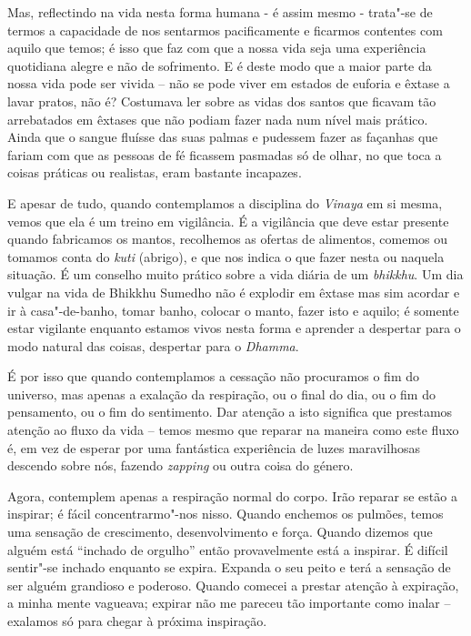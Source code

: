 Mas, reflectindo na vida nesta forma humana - é assim mesmo - trata"-se
de termos a capacidade de nos sentarmos pacificamente e ficarmos
contentes com aquilo que temos; é isso que faz com que a nossa vida seja
uma experiência quotidiana alegre e não de sofrimento. E é deste modo
que a maior parte da nossa vida pode ser vivida -- não se pode viver em
estados de euforia e êxtase a lavar pratos, não é? Costumava ler sobre
as vidas dos santos que ficavam tão arrebatados em êxtases que não
podiam fazer nada num nível mais prático. Ainda que o sangue fluísse das
suas palmas e pudessem fazer as façanhas que fariam com que as pessoas
de fé ficassem pasmadas só de olhar, no que toca a coisas práticas ou
realistas, eram bastante incapazes.

E apesar de tudo, quando contemplamos a disciplina do \emph{Vinaya} em
si mesma, vemos que ela é um treino em vigilância. É a vigilância que
deve estar presente quando fabricamos os mantos, recolhemos as ofertas
de alimentos, comemos ou tomamos conta do \emph{kuti} (abrigo), e que
nos indica o que fazer nesta ou naquela situação. É um conselho muito
prático sobre a vida diária de um \emph{bhikkhu}. Um dia vulgar na vida
de Bhikkhu Sumedho não é explodir em êxtase mas sim acordar e ir à
casa"-de-banho, tomar banho, colocar o manto, fazer isto e aquilo; é
somente estar vigilante enquanto estamos vivos nesta forma e aprender a
despertar para o modo natural das coisas, despertar para o
\emph{Dhamma}.

É por isso que quando contemplamos a cessação não procuramos o fim do
universo, mas apenas a exalação da respiração, ou o final do dia, ou o
fim do pensamento, ou o fim do sentimento. Dar atenção a isto significa
que prestamos atenção ao fluxo da vida -- temos mesmo que reparar na
maneira como este fluxo é, em vez de esperar por uma fantástica
experiência de luzes maravilhosas descendo sobre nós, fazendo
\emph{zapping} ou outra coisa do género.

Agora, contemplem apenas a respiração normal do corpo. Irão reparar se
estão a inspirar; é fácil concentrarmo"-nos nisso. Quando enchemos os
pulmões, temos uma sensação de crescimento,  desenvolvimento e força.
Quando dizemos que alguém está ``inchado de orgulho'' então
provavelmente está a inspirar. É difícil sentir"-se inchado enquanto se
expira. Expanda o seu peito e terá a sensação de ser alguém grandioso e
poderoso. Quando comecei a prestar atenção à expiração, a minha mente
vagueava; expirar não me pareceu tão importante como inalar -- exalamos
só para chegar à próxima inspiração.

